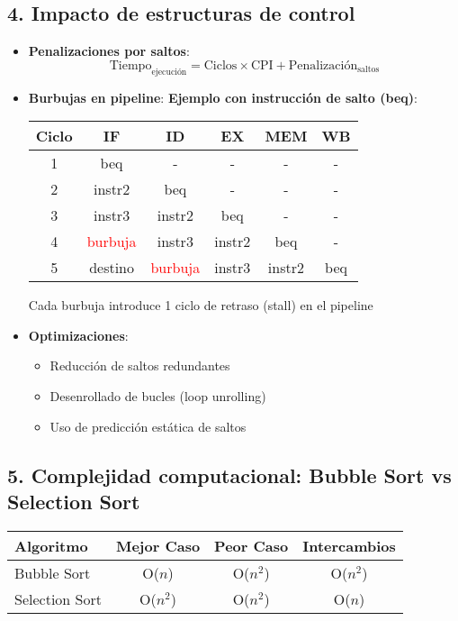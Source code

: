\documentclass{article}
\begin{document}
\subsection*{4. Impacto de estructuras de control}
\begin{itemize}
  \item \textbf{Penalizaciones por saltos}:
  \begin{equation*}
    \text{Tiempo}_{\text{ejecución}} = \text{Ciclos} \times \text{CPI} + \text{Penalización}_{\text{saltos}}
  \end{equation*}
  
  \item \textbf{Burbujas en pipeline}:
  \textbf{Ejemplo con instrucción de salto (beq)}:
  \begin{center}
    \begin{tabular}{|c|c|c|c|c|c|}
      \hline
      \textbf{Ciclo} & \textbf{IF} & \textbf{ID} & \textbf{EX} & \textbf{MEM} & \textbf{WB} \\
      \hline
      1 & beq & - & - & - & - \\
      \hline
      2 & instr2 & beq & - & - & - \\
      \hline
      3 & instr3 & instr2 & beq & - & - \\
      \hline
      4 & \textcolor{red}{burbuja} & instr3 & instr2 & beq & - \\
      \hline
      5 & destino & \textcolor{red}{burbuja} & instr3 & instr2 & beq \\
      \hline
    \end{tabular}
  \end{center}
  Cada burbuja introduce 1 ciclo de retraso (stall) en el pipeline
  
  \item \textbf{Optimizaciones}:
  \begin{itemize}
    \item Reducción de saltos redundantes
    \item Desenrollado de bucles (loop unrolling)
    \item Uso de predicción estática de saltos
  \end{itemize}
\end{itemize}

\subsection*{5. Complejidad computacional: Bubble Sort vs Selection Sort}
\begin{center}
  \begin{tabular}{l|c|c|c}
    \textbf{Algoritmo} & \textbf{Mejor Caso} & \textbf{Peor Caso} & \textbf{Intercambios} \\
    \hline
    Bubble Sort & O($n$) & O($n^2$) & O($n^2$) \\
    Selection Sort & O($n^2$) & O($n^2$) & O($n$) \\
  \end{tabular}
\end{center}
\end{document}
